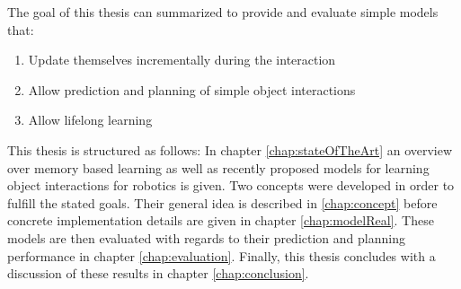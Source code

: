 The goal of this thesis can summarized to provide and evaluate simple models that:
\begin{enumerate}
	\item Update themselves incrementally during the interaction
	\item Allow prediction and planning of simple object interactions %
	\item Allow lifelong learning
\end{enumerate}

This thesis is structured as follows: In chapter \ref{chap:stateOfTheArt} an overview over memory based learning as well as recently proposed models for learning object interactions for robotics is given. Two concepts were developed in order to fulfill the stated goals. Their general idea is described in \ref{chap:concept} before concrete implementation details are given in chapter \ref{chap:modelReal}. These models are then evaluated with regards to their prediction and planning performance in chapter \ref{chap:evaluation}. Finally, this thesis concludes with a discussion of these results in chapter \ref{chap:conclusion}.

